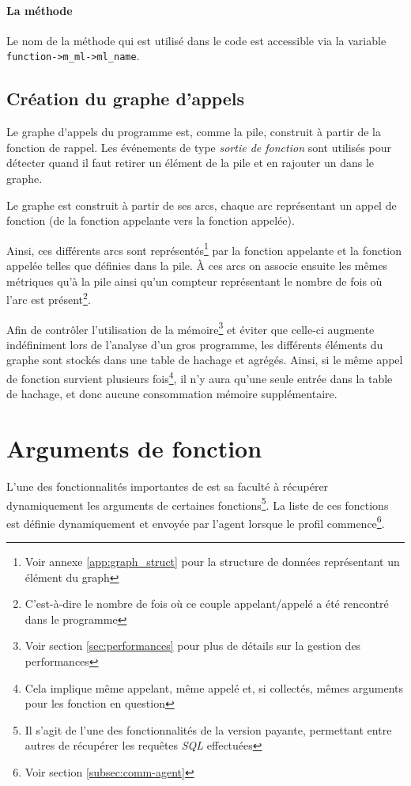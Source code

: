 \paragraph*{La méthode} Le nom de la méthode qui est utilisé dans le code \Python est accessible via la variable \verb|function->m_ml->ml_name|.
  
\subsection{Création du graphe d'appels}
\label{subsec:crea-graph-appel}
Le \gls{graphe d'appels} du programme est, comme la pile, construit à partir de la fonction de rappel. Les événements de type \emph{sortie de fonction} sont utilisés pour détecter quand il faut retirer un élément de la pile et en rajouter un dans le graphe.

Le graphe est construit à partir de ses arcs, chaque arc représentant un appel de fonction (de la fonction appelante vers la fonction appelée).

Ainsi, ces différents arcs sont représentés\footnote{Voir annexe \vref{app:graph_struct} pour la structure de données représentant un élément du graph} par la fonction appelante et la fonction appelée telles que définies dans la pile. À ces arcs on associe ensuite les mêmes métriques qu'à la pile ainsi qu'un compteur représentant le nombre de fois où l'arc est présent\footnote{C'est-à-dire le nombre de fois où ce couple appelant/appelé a été rencontré dans le programme}.

\begin{note}
Afin de contrôler l'utilisation de la mémoire\footnote{Voir section \vref{sec:performances} pour plus de détails sur la gestion des performances} et éviter que celle-ci augmente indéfiniment lors de l'analyse d'un gros programme, les différents éléments du graphe sont stockés dans une table de hachage et agrégés. Ainsi, si le même appel de fonction survient plusieurs fois\footnote{Cela implique même appelant, même appelé et, si collectés, mêmes arguments pour les fonction en question}, il n'y aura qu'une seule entrée dans la table de hachage, et donc aucune consommation mémoire supplémentaire.
\end{note}

  \section{Arguments de fonction}
  \label{sec:fnargs}
L'une des fonctionnalités importantes de \Blackfire est sa faculté à récupérer dynamiquement les arguments de certaines fonctions\footnote{Il s'agit de l'une des fonctionnalités de la version payante, permettant entre autres de récupérer les requêtes \emph{SQL} effectuées}. La liste de ces fonctions est définie dynamiquement et envoyée par l'agent lorsque le profil commence\footnote{Voir section \vref{subsec:comm-agent}}.


